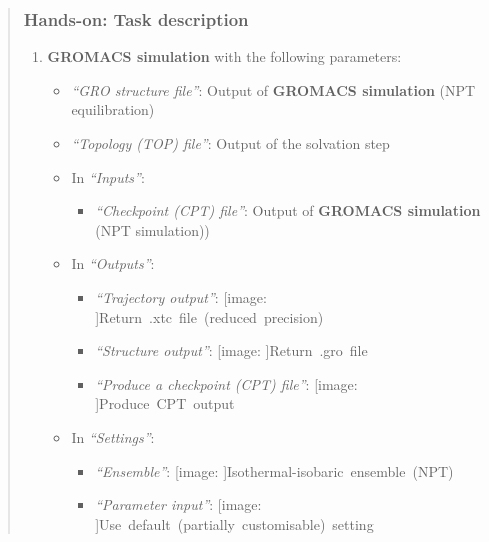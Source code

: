 \documentclass[twocolumn]{bmcart}%
\def\texttt{[image: ]}
\providecommand{\tightlist}{%
  \setlength{\itemsep}{0pt}\setlength{\parskip}{0pt}}
\begin{document}
\begin{quote}
\hypertarget{hands-on-task-description-6}{%
\subsubsection{Hands-on: Task
description}\label{hands-on-task-description-6}}

\begin{enumerate}
\def\labelenumi{\arabic{enumi}.}
\tightlist
\item
  \textbf{GROMACS simulation} with the following parameters:

  \begin{itemize}
  \tightlist
  \item
    \emph{``GRO structure file''}: Output of \textbf{GROMACS simulation}
    (NPT equilibration)
  \item
    \emph{``Topology (TOP) file''}: Output of the solvation step
  \item
    In \emph{``Inputs''}:

    \begin{itemize}
    \tightlist
    \item
      \emph{``Checkpoint (CPT) file''}: Output of \textbf{GROMACS
      simulation} (NPT simulation))
    \end{itemize}
  \item
    In \emph{``Outputs''}:

    \begin{itemize}
    \tightlist
    \item
      \emph{``Trajectory output''}:
      \texttt{Return\ .xtc\ file\ (reduced\ precision)}
    \item
      \emph{``Structure output''}: \texttt{Return\ .gro\ file}
    \item
      \emph{``Produce a checkpoint (CPT) file''}:
      \texttt{Produce\ CPT\ output}
    \end{itemize}
  \item
    In \emph{``Settings''}:

    \begin{itemize}
    \tightlist
    \item
      \emph{``Ensemble''}: \texttt{Isothermal-isobaric\ ensemble\ (NPT)}
    \item
      \emph{``Parameter input''}:
      \texttt{Use\ default\ (partially\ customisable)\ setting}


\end{itemize}
\end{itemize}
\end{enumerate}
\end{quote}
\end{document}
